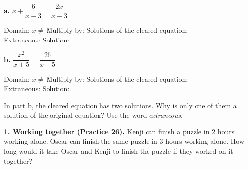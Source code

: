\begin{minipage}[t]{0.48\textwidth}
\vspace{0pt}
\textbf{a.} $x+\dfrac{6}{x-3}=\dfrac{2x}{x-3}$

Domain: $x\neq$\,\blank[1.2cm] \quad Multiply by: \blank[1.6cm]
\lines[4]
Solutions of the cleared equation: \blank[2.4cm]\\[4pt]
Extraneous: \blank[1.6cm] \quad Solution: \blank[1.6cm]
\end{minipage}\hfill
\begin{minipage}[t]{0.48\textwidth}
\vspace{0pt}
\textbf{b.} $\dfrac{x^2}{x+5}=\dfrac{25}{x+5}$

Domain: $x\neq$\,\blank[1.2cm] \quad Multiply by: \blank[1.6cm]
\lines[4]
Solutions of the cleared equation: \blank[2.4cm]\\[4pt]
Extraneous: \blank[1.6cm] \quad Solution: \blank[1.6cm]
\end{minipage}

\vspace{4pt}
In part b, the cleared equation has two solutions. Why is only one of them a solution of the original equation? Use the word \emph{extraneous}.
\lines[2]

\textbf{1. Working together (Practice 26).} Kenji can finish a puzzle in 2 hours working alone. Oscar can finish the same puzzle in 3 hours working alone. How long would it take Oscar and Kenji to finish the puzzle if they worked on it together?

